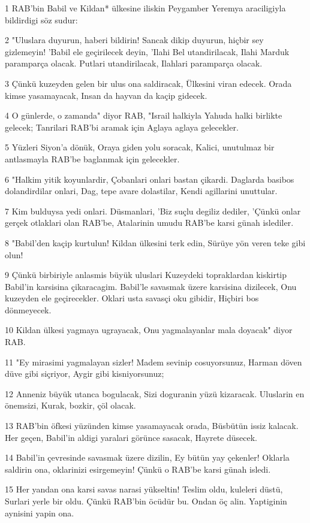 \par 1 RAB'bin Babil ve Kildan* ülkesine iliskin Peygamber Yeremya araciligiyla bildirdigi söz sudur:
\par 2 "Uluslara duyurun, haberi bildirin! Sancak dikip duyurun, hiçbir sey gizlemeyin! 'Babil ele geçirilecek deyin, 'Ilahi Bel utandirilacak, Ilahi Marduk paramparça olacak. Putlari utandirilacak, Ilahlari paramparça olacak.
\par 3 Çünkü kuzeyden gelen bir ulus ona saldiracak, Ülkesini viran edecek. Orada kimse yasamayacak, Insan da hayvan da kaçip gidecek.
\par 4 O günlerde, o zamanda" diyor RAB, "Israil halkiyla Yahuda halki birlikte gelecek; Tanrilari RAB'bi aramak için Aglaya aglaya gelecekler.
\par 5 Yüzleri Siyon'a dönük, Oraya giden yolu soracak, Kalici, unutulmaz bir antlasmayla RAB'be baglanmak için gelecekler.
\par 6 "Halkim yitik koyunlardir, Çobanlari onlari bastan çikardi. Daglarda basibos dolandirdilar onlari, Dag, tepe avare dolastilar, Kendi agillarini unuttular.
\par 7 Kim bulduysa yedi onlari. Düsmanlari, 'Biz suçlu degiliz dediler, 'Çünkü onlar gerçek otlaklari olan RAB'be, Atalarinin umudu RAB'be karsi günah islediler.
\par 8 "Babil'den kaçip kurtulun! Kildan ülkesini terk edin, Sürüye yön veren teke gibi olun!
\par 9 Çünkü birbiriyle anlasmis büyük uluslari Kuzeydeki topraklardan kiskirtip Babil'in karsisina çikaracagim. Babil'le savasmak üzere karsisina dizilecek, Onu kuzeyden ele geçirecekler. Oklari usta savasçi oku gibidir, Hiçbiri bos dönmeyecek.
\par 10 Kildan ülkesi yagmaya ugrayacak, Onu yagmalayanlar mala doyacak" diyor RAB.
\par 11 "Ey mirasimi yagmalayan sizler! Madem sevinip cosuyorsunuz, Harman döven düve gibi siçriyor, Aygir gibi kisniyorsunuz;
\par 12 Anneniz büyük utanca bogulacak, Sizi doguranin yüzü kizaracak. Uluslarin en önemsizi, Kurak, bozkir, çöl olacak.
\par 13 RAB'bin öfkesi yüzünden kimse yasamayacak orada, Büsbütün issiz kalacak. Her geçen, Babil'in aldigi yaralari görünce sasacak, Hayrete düsecek.
\par 14 Babil'in çevresinde savasmak üzere dizilin, Ey bütün yay çekenler! Oklarla saldirin ona, oklarinizi esirgemeyin! Çünkü o RAB'be karsi günah isledi.
\par 15 Her yandan ona karsi savas narasi yükseltin! Teslim oldu, kuleleri düstü, Surlari yerle bir oldu. Çünkü RAB'bin öcüdür bu. Ondan öç alin. Yaptiginin aynisini yapin ona.
